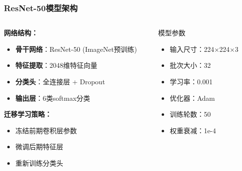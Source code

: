 \documentclass[12pt]{beamer}
\begin{document}
\begin{frame}
\frametitle{ResNet-50模型架构}
\begin{columns}
\begin{column}{0.6\textwidth}
\textbf{网络结构：}
\begin{itemize}
    \item \textbf{骨干网络}：ResNet-50 (ImageNet预训练)
    \item \textbf{特征提取}：2048维特征向量
    \item \textbf{分类头}：全连接层 + Dropout
    \item \textbf{输出层}：6类softmax分类
\end{itemize}

\vspace{0.3cm}
\textbf{迁移学习策略：}
\begin{itemize}
    \item 冻结前期卷积层参数
    \item 微调后期特征层
    \item 重新训练分类头
\end{itemize}
\end{column}

\begin{column}{0.4\textwidth}
\begin{block}{模型参数}
\small
\begin{itemize}
    \item 输入尺寸：224×224×3
    \item 批次大小：32
    \item 学习率：0.001
    \item 优化器：Adam
    \item 训练轮数：50
    \item 权重衰减：1e-4
\end{itemize}
\end{block}
\end{column}
\end{columns}
\end{frame}
\end{document}
